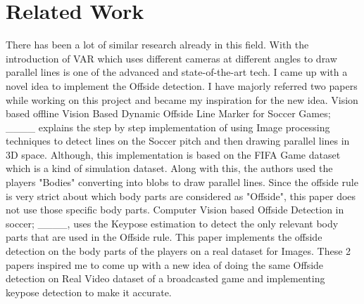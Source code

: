 \section{Related Work}
There has been a lot of similar research already in this field. With the introduction of VAR which uses different cameras at different angles to draw parallel lines is one of the advanced and state-of-the-art tech. I came up with a novel idea to implement the Offside detection. I have majorly referred two papers while working on this project and became my inspiration for the new idea. Vision based offline Vision Based Dynamic Offside Line Marker for Soccer Games; ____ explains the step by step implementation of using Image processing techniques to detect lines on the Soccer pitch and then drawing parallel lines in 3D space. Although, this implementation is based on the FIFA Game dataset which is a kind of simulation dataset. Along with this, the authors used the players "Bodies" converting into blobs to draw parallel lines. Since the offside rule is very strict about which body parts are considered as "Offside", this paper does not use those specific body parts. Computer Vision based Offside Detection in soccer; ____, uses the Keypose estimation to detect the only relevant body parts that are used in the Offside rule. This paper implements the offside detection on the body parts of the players on a real dataset for Images. These 2 papers inspired me to come up with a new idea of doing the same Offside detection on Real Video dataset of a broadcasted game and implementing keypose detection to make it accurate.